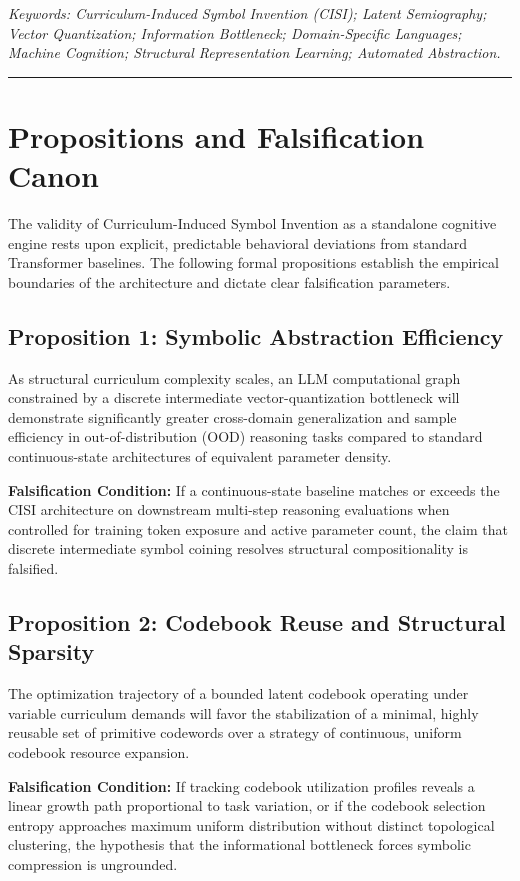 \noindent \textit{Keywords: Curriculum-Induced Symbol Invention (CISI); Latent Semiography; Vector Quantization; Information Bottleneck; Domain-Specific Languages; Machine Cognition; Structural Representation Learning; Automated Abstraction.}

\vspace{2em}
\hrule
\vspace{2em}

\chapter{Propositions and Falsification Canon}

The validity of Curriculum-Induced Symbol Invention as a standalone cognitive engine rests upon explicit, predictable behavioral deviations from standard Transformer baselines. The following formal propositions establish the empirical boundaries of the architecture and dictate clear falsification parameters.

\section*{Proposition 1: Symbolic Abstraction Efficiency}
As structural curriculum complexity scales, an LLM computational graph constrained by a discrete intermediate vector-quantization bottleneck will demonstrate significantly greater cross-domain generalization and sample efficiency in out-of-distribution (OOD) reasoning tasks compared to standard continuous-state architectures of equivalent parameter density.

\textbf{Falsification Condition:} If a continuous-state baseline matches or exceeds the CISI architecture on downstream multi-step reasoning evaluations when controlled for training token exposure and active parameter count, the claim that discrete intermediate symbol coining resolves structural compositionality is falsified.

\section*{Proposition 2: Codebook Reuse and Structural Sparsity}
The optimization trajectory of a bounded latent codebook operating under variable curriculum demands will favor the stabilization of a minimal, highly reusable set of primitive codewords over a strategy of continuous, uniform codebook resource expansion.

\textbf{Falsification Condition:} If tracking codebook utilization profiles reveals a linear growth path proportional to task variation, or if the codebook selection entropy approaches maximum uniform distribution without distinct topological clustering, the hypothesis that the informational bottleneck forces symbolic compression is ungrounded.

